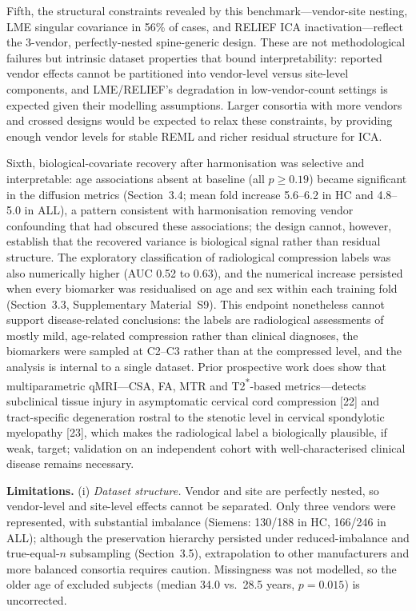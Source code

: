 \documentclass[12pt,a4paper]{article}
\begin{document}
Fifth, the structural constraints revealed by this benchmark---vendor-site nesting, LME singular covariance in 56\% of cases, and RELIEF ICA inactivation---reflect the 3-vendor, perfectly-nested spine-generic design. These are not methodological failures but intrinsic dataset properties that bound interpretability: reported vendor effects cannot be partitioned into vendor-level versus site-level components, and LME/RELIEF's degradation in low-vendor-count settings is expected given their modelling assumptions. Larger consortia with more vendors and crossed designs would be expected to relax these constraints, by providing enough vendor levels for stable REML and richer residual structure for ICA.

Sixth, biological-covariate recovery after harmonisation was selective and interpretable: age associations absent at baseline (all $p\geq0.19$) became significant in the diffusion metrics (Section~3.4; mean fold increase 5.6--6.2 in HC and 4.8--5.0 in ALL), a pattern consistent with harmonisation removing vendor confounding that had obscured these associations; the design cannot, however, establish that the recovered variance is biological signal rather than residual structure. The exploratory classification of radiological compression labels was also numerically higher (AUC 0.52 to 0.63), and the numerical increase persisted when every biomarker was residualised on age and sex within each training fold (Section~3.3, Supplementary Material~S9). This endpoint nonetheless cannot support disease-related conclusions: the labels are radiological assessments of mostly mild, age-related compression rather than clinical diagnoses, the biomarkers were sampled at C2--C3 rather than at the compressed level, and the analysis is internal to a single dataset. Prior prospective work does show that multiparametric qMRI---CSA, FA, MTR and T2\textsuperscript{*}-based metrics---detects subclinical tissue injury in asymptomatic cervical cord compression [22] and tract-specific degeneration rostral to the stenotic level in cervical spondylotic myelopathy [23], which makes the radiological label a biologically plausible, if weak, target; validation on an independent cohort with well-characterised clinical disease remains necessary.

\textbf{Limitations.} (i) \emph{Dataset structure.} Vendor and site are perfectly nested, so vendor-level and site-level effects cannot be separated. Only three vendors were represented, with substantial imbalance (Siemens: 130/188 in HC, 166/246 in ALL); although the preservation hierarchy persisted under reduced-imbalance and true-equal-$n$ subsampling (Section~3.5), extrapolation to other manufacturers and more balanced consortia requires caution. Missingness was not modelled, so the older age of excluded subjects (median 34.0 vs.\ 28.5 years, $p=0.015$) is uncorrected.
\end{document}
